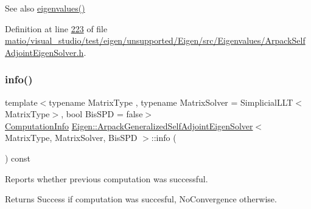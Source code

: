 \begin{DoxySeeAlso}{See also}
\hyperlink{class_eigen_1_1_arpack_generalized_self_adjoint_eigen_solver_ab46900dafdd11a8ac05a662c6b41480d}{eigenvalues()} 
\end{DoxySeeAlso}


Definition at line \hyperlink{matio_2visual__studio_2test_2eigen_2unsupported_2_eigen_2src_2_eigenvalues_2_arpack_self_adjoint_eigen_solver_8h_source_l00223}{223} of file \hyperlink{matio_2visual__studio_2test_2eigen_2unsupported_2_eigen_2src_2_eigenvalues_2_arpack_self_adjoint_eigen_solver_8h_source}{matio/visual\+\_\+studio/test/eigen/unsupported/\+Eigen/src/\+Eigenvalues/\+Arpack\+Self\+Adjoint\+Eigen\+Solver.\+h}.

\mbox{\label{class_eigen_1_1_arpack_generalized_self_adjoint_eigen_solver_a6f952eed50efe01b8cb91726e6a93b68}} 
\subsubsection{\texorpdfstring{info()}{info()}\hspace{0.1cm}{\footnotesize\ttfamily [1/2]}}
{\footnotesize\ttfamily template$<$typename Matrix\+Type , typename Matrix\+Solver  = Simplicial\+L\+L\+T$<$\+Matrix\+Type$>$, bool Bis\+S\+PD = false$>$ \\
\hyperlink{group__enums_ga85fad7b87587764e5cf6b513a9e0ee5e}{Computation\+Info} \hyperlink{class_eigen_1_1_arpack_generalized_self_adjoint_eigen_solver}{Eigen\+::\+Arpack\+Generalized\+Self\+Adjoint\+Eigen\+Solver}$<$ Matrix\+Type, Matrix\+Solver, Bis\+S\+PD $>$\+::info (\begin{DoxyParamCaption}{ }\end{DoxyParamCaption}) const\hspace{0.3cm}{\ttfamily [inline]}}



Reports whether previous computation was successful. 

\begin{DoxyReturn}{Returns}
{\ttfamily Success} if computation was succesful, {\ttfamily No\+Convergence} otherwise. 
\end{DoxyReturn}


